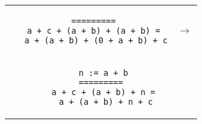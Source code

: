 \begin{landscape}
\begin{small}
\begin{multicols*}{3}[\begin{center}\section*{}\end{center}]
  \begin{tabular}{cc}
  \begin{minipage}{0.22\textwidth}\begin{lstlisting}
  =========
  a + c + (a + b) + (a + b) =
   a + (a + b) + (0 + a + b) + c
  \end{lstlisting}\end{minipage}
  & $\to$\\
  \begin{minipage}{0.22\textwidth}\begin{lstlisting}
      n := a + b
     =========
      a + c + (a + b) + n =
       a + (a + b) + n + c
  \end{lstlisting}\end{minipage}
  \end{tabular}

\end{multicols*}

\end{small}
\end{landscape}
\restoregeometry
